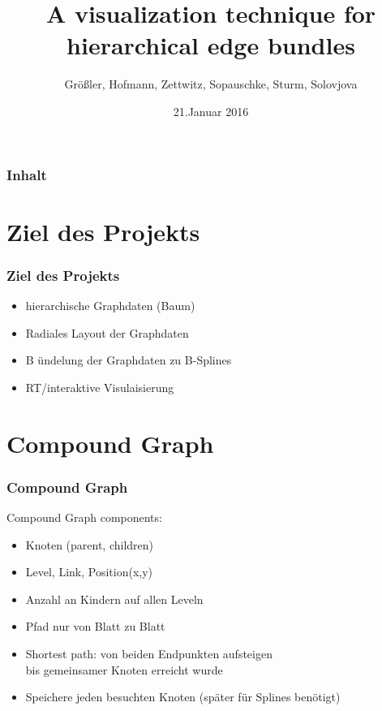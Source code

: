 \documentclass[11pt]{beamer}
\author{Größler, Hofmann, Zettwitz, Sopauschke, Sturm, Solovjova}
\title{A visualization technique for \\  hierarchical edge bundles}
\date{21.Januar 2016}
\begin{document}
\begin{frame}
\titlepage
\end{frame}

\begin{frame}
\frametitle{Inhalt} 
\tableofcontents
\end{frame}


\section{Ziel des Projekts}
\begin{frame}
\frametitle{Ziel des Projekts}
\begin{itemize} 
\item hierarchische Graphdaten (Baum)
\item Radiales Layout der Graphdaten
\item B ündelung der Graphdaten zu B-Splines
\item RT/interaktive Visulaisierung
\end{itemize}
\end{frame}



\section{Compound Graph}
\begin{frame}[allowframebreaks]
\frametitle{Compound Graph}

Compound Graph components:
\begin{itemize} 
\item Knoten (parent, children)                                                                                                                       
\item Level, Link, Position(x,y)
\item Anzahl an Kindern auf allen Leveln
\end{itemize}

\framebreak
\begin{itemize} 
\item Pfad nur von Blatt zu Blatt
\item Shortest path: von beiden Endpunkten aufsteigen \\ bis gemeinsamer Knoten erreicht wurde
\item Speichere jeden besuchten Knoten (später für Splines benötigt)
\end{itemize}


\end{frame}
\end{document}
